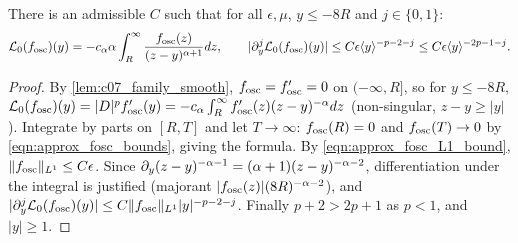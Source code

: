 \begin{lemma}
  \label{lem:c07_negative_osc}
  There is an admissible $C$ such that for all $\epsilon,\mu$, $y\le-8R$ and $j\in\{0,1\}$:
  \[
    \mathcal{L}_0(f_{\textup{osc}})(y)=-c_\alpha\alpha\int_R^\infty\frac{f_{\textup{osc}}(z)}{(z-y)^{\alpha+1}}dz,\qquad
    |\partial_y^j\mathcal{L}_0(f_{\textup{osc}})(y)|\le C\epsilon\langle y \rangle^{-p-2-j}\le C\epsilon\langle y \rangle^{-2p-1-j}.
  \]
\end{lemma}
\begin{proof}
  By \cref{lem:c07_family_smooth}, $f_{\textup{osc}}=f_{\textup{osc}}'=0$ on $(-\infty,R]$, so for $y\le-8R$,
  $\mathcal{L}_0(f_{\textup{osc}})(y)=|D|^pf_{\textup{osc}}'(y)=-c_\alpha\int_R^\infty f_{\textup{osc}}'(z)(z-y)^{-\alpha}dz$ (non-singular, $z-y\ge|y|$).
  Integrate by parts on $[R,T]$ and let $T\to\infty$: $f_{\textup{osc}}(R)=0$ and $f_{\textup{osc}}(T)\to0$ by
  \eqref{eqn:approx_fosc_bounds}, giving the formula. By \eqref{eqn:approx_fosc_L1_bound},
  $\|f_{\textup{osc}}\|_{L^1}\le C\epsilon$. Since $\partial_y(z-y)^{-\alpha-1}=(\alpha+1)(z-y)^{-\alpha-2}$, differentiation under
  the integral is justified (majorant $|f_{\textup{osc}}(z)|(8R)^{-\alpha-2}$), and
  $|\partial_y^j\mathcal{L}_0(f_{\textup{osc}})(y)|\le C\|f_{\textup{osc}}\|_{L^1}|y|^{-p-2-j}$. Finally $p+2>2p+1$ as $p<1$, and $|y|\ge1$.
\end{proof}

